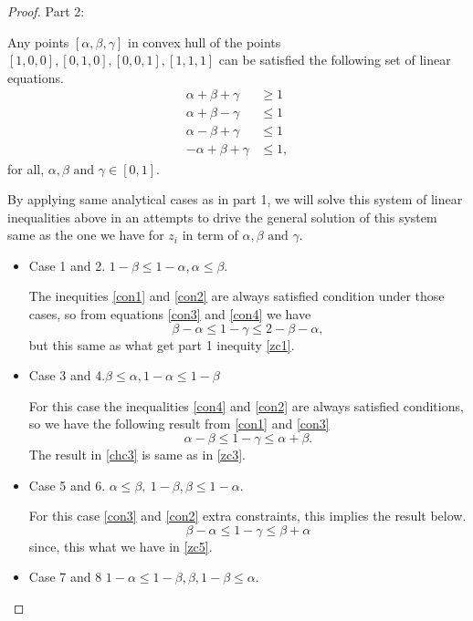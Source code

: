 \begin{proof}
Part 2:

Any points $[\alpha,\beta,\gamma]$ in convex hull of the points $[1, 0, 0], [0, 1, 0], [0, 0, 1], [1, 1, 1]$ can be satisfied the following set of linear equations.
\begin{align}
\alpha+\beta+\gamma &\geq 1\label{con1}\\
\alpha+\beta-\gamma &\leq 1\label{con2}\\
\alpha-\beta+\gamma &\leq 1\label{con3}\\
-\alpha+\beta+\gamma &\leq 1\label{con4},
\end{align}
for all, $ \alpha, \beta \text{ and }\gamma \in [0,1]$.

By applying same analytical cases as in part 1, we will solve this system of linear  inequalities above in an attempts to drive the general solution of this system same as the one we have for $z_i$ in term of $ \alpha, \beta \text{ and }\gamma$.
\begin{itemize}
\item Case 1 and  2. $1-\beta \leq 1-\alpha,\alpha \leq \beta$.

The inequities \ref{con1} and \ref{con2} are always satisfied condition under those cases, so from equations \ref{con3} and \ref{con4} we have
\begin{equation}
\beta-\alpha \leq 1-\gamma \leq 2-\beta-\alpha, 
\end{equation}
but this same as what get part 1  inequity \ref{zc1}.
\item Case 3  and 4.$\beta \leq \alpha,1-\alpha \leq 1-\beta$

For this case the inequalities \ref{con4} and \ref{con2} are always satisfied conditions, so we have the following result from \ref{con1} and \ref{con3} 
\begin{equation}\label{chc3}
\alpha-\beta \leq 1-\gamma \leq \alpha+\beta.
\end{equation}
The result in \ref{chc3} is same as in \ref{zc3}.

\item  Case 5 and 6. $\alpha\leq \beta,\ 1-\beta ,\beta\leq 1-\alpha$.

For this case  \ref{con3} and \ref{con2} extra constraints, this implies the result below.
\begin{equation}
\beta -\alpha \leq 1-\gamma\leq \beta +\alpha
\end{equation}
since, this what we have in \ref{zc5}.
\item  Case 7 and 8  $1-\alpha \leq 1-\beta,\beta ,1-\beta \leq \alpha$.


\end{itemize}
\end{proof}

